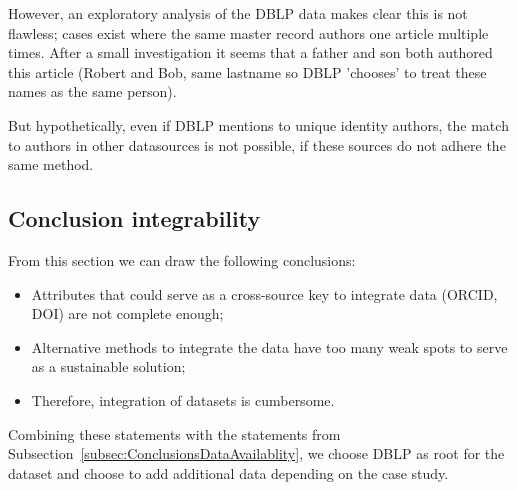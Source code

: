 \documentclass{ou-report}
\newcommand{\doi}{{DOI}}
\newcommand{\dblp}{DBLP}
\newcommand{\orcid}{ORCID}
\begin{document}
However, an exploratory analysis of the DBLP data makes clear this is not 
flawless; cases exist where the same master record authors one 
article multiple times. After a small investigation it seems that a father 
and son both authored this article (Robert and Bob, same lastname so DBLP 
'chooses' to treat these names as the same person).

But hypothetically, even if DBLP mentions to unique identity authors, 
the match to authors in other datasources is not possible, if these sources 
do not adhere the same method.




\subsection{Conclusion integrability}
From this section we can draw the following conclusions:
\begin{itemize}
    \item Attributes that could serve as a cross-source key to integrate data 
    (\orcid{}, \doi{}) are not complete enough;
    \item Alternative methods to integrate the data have too many weak spots to
    serve as a sustainable solution;
    \item Therefore, integration of datasets is cumbersome.
\end{itemize}

Combining these statements with the statements from 
Subsection~\ref{subsec:ConclusionsDataAvailablity}, we choose \dblp{} as root 
for the dataset and choose to add additional data depending on the case study.
\end{document}
